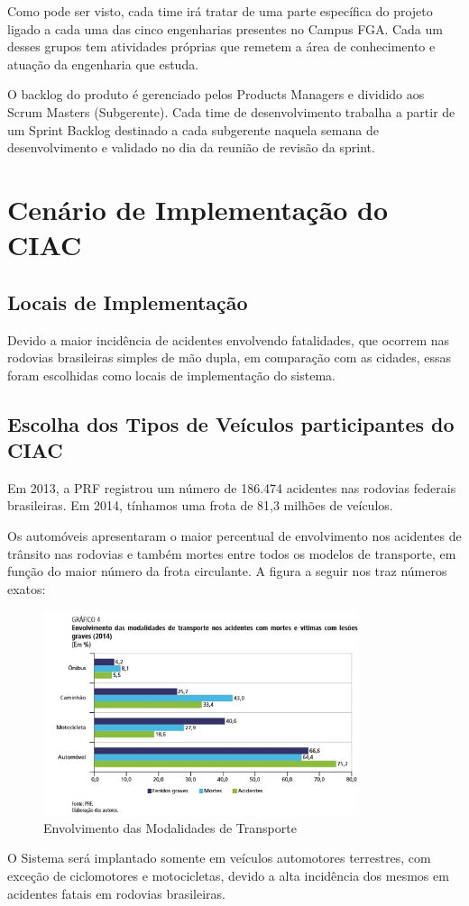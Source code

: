 Como pode ser visto, cada time irá tratar de uma  parte específica do projeto ligado a cada uma das cinco engenharias presentes no Campus FGA. Cada um desses grupos tem atividades próprias que remetem a área de conhecimento e atuação da engenharia que estuda.

O backlog do produto é gerenciado pelos Products Managers e dividido aos Scrum Masters (Subgerente). Cada time de desenvolvimento trabalha a partir de um Sprint Backlog destinado a cada subgerente naquela semana de desenvolvimento e validado no dia da reunião de revisão da sprint.


\section{Cenário de Implementação do CIAC}

\subsection{Locais de Implementação}

Devido a maior incidência de acidentes envolvendo fatalidades, que ocorrem nas rodovias brasileiras simples de mão dupla, em comparação com as cidades, essas foram escolhidas como locais de implementação do sistema.


\subsection{Escolha dos Tipos de Veículos participantes do CIAC}

Em 2013, a PRF registrou um número de 186.474 acidentes nas rodovias federais brasileiras. Em 2014, tínhamos uma frota de 81,3 milhões de veículos.

Os automóveis apresentaram o maior percentual de envolvimento nos acidentes de trânsito nas rodovias e também mortes entre todos os modelos de transporte, em função do maior número da frota circulante. A figura a seguir nos traz números exatos:

\begin{figure}[h!]
  \centering
  \includegraphics[width=350px, scale=0.5]{figuras/niveisacidente}
  \caption{Envolvimento das Modalidades de Transporte}
\label{fig:time}
\end{figure}

O Sistema será implantado somente em veículos automotores terrestres, com exceção de ciclomotores e motocicletas, devido a alta incidência dos mesmos em acidentes fatais em rodovias brasileiras.
